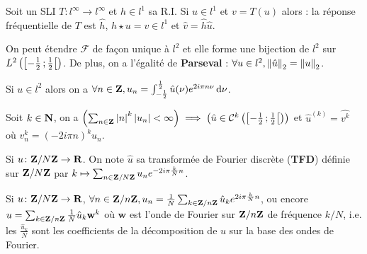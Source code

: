 \begin{pop}
	Soit un SLI $T \colon l^\infty \to l^\infty$ et $h \in l^1$ sa R.I.
	Si $u \in l^1$ et $v = T(u)$ alors : la réponse fréquentielle de $T$ est $\hat{h}$, $h \star u = v \in l^1$ et $\hat{v} = \hat{h} \hat{u}$.
\end{pop}

\begin{thm}
	On peut étendre $\mathcal{F}$ de façon unique à $l^2$ et elle forme une bijection de $l^2$ sur $L^2 \left( \mathopen{}\mathclose{\left[-\frac{1}{2}\mathclose{}\mathpunct{};\frac{1}{2}\right[} \right)$.
	De plus, on a l'égalité de \textbf{Parseval} : $\forall u \in l^2, \left\lVert\hat{u}\right\rVert_2 = \left\lVert u\right\rVert_2$.
\end{thm}

\begin{thm}
	Si $u \in l^2$ alors on a $\forall n \in \mathbf{Z}, u_n = \int_{-\frac{1}{2}}^{\frac{1}{2}} \hat{u}(\nu) e^{2i\pi n\nu} \mathop{}\mathopen{}\mathrm{d} \nu$.
\end{thm}

\begin{thm}
	Soit $k \in \mathbf{N}$, on a $\left( \sum_{n \in \mathbf{Z}} \left\lvert n\right\rvert^k \left\lvert u_n\right\rvert < \infty \right) \implies \left( \hat{u} \in \mathcal{C}^k \left( \mathopen{}\mathclose{\left[-\frac{1}{2}\mathclose{}\mathpunct{};\frac{1}{2}\right[} \right) \right)$ et $\hat{u}^{(k)} = \hat{v^k}$ où $v_n^k = (-2i\pi n)^k u_n$.
\end{thm}

\begin{thm}
	Si $u \colon \mathbf{Z} / N\mathbf{Z} \to \mathbf{R}$.
	On note $\hat{u}$ sa transformée de Fourier discrète (\textbf{TFD}) définie sur $\mathbf{Z} / N\mathbf{Z}$ par $k \mapsto \sum_{n \in \mathbf{Z} / N\mathbf{Z}} u_n e^{-2i\pi \frac{k}{N}n}$.
\end{thm}

\begin{thm}
	Si $u \colon \mathbf{Z} / N\mathbf{Z} \to \mathbf{R}$, $\forall n \in \mathbf{Z} / n\mathbf{Z}, u_n = \frac{1}{N} \sum_{k \in \mathbf{Z} / n\mathbf{Z}} \hat{u}_k e^{2i\pi \frac{k}{N} n}$, ou encore $u = \sum_{k \in \mathbf{Z} / n\mathbf{Z}} \frac{1}{N} \hat{u}_k \mathbf{w}^k$ où $\mathbf{w}$ est l'onde de Fourier sur $\mathbf{Z} / n \mathbf{Z}$ de fréquence $k/N$, i.e. les $\frac{\hat{u}_k}{N}$ sont les coefficients de la décomposition de $u$ sur la base des ondes de Fourier.
\end{thm}

